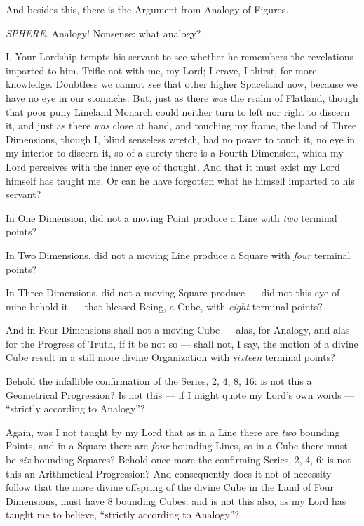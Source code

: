 \documentclass[10pt, kindle, oneside]{kindle}
\begin{document}
And besides this, there is the Argument from Analogy of Figures.

\emph{SPHERE}. Analogy! Nonsense: what analogy?

I. Your Lordship tempts his servant to see whether he remembers the
revelations imparted to him. Trifle not with me, my Lord; I crave, I thirst,
for more knowledge. Doubtless we cannot \emph{see} that other higher Spaceland now,
because we have no eye in our stomachs. But, just as there \emph{was} the realm of
Flatland, though that poor puny Lineland Monarch could neither turn to left
nor right to discern it, and just as there \emph{was} close at hand, and touching my
frame, the land of Three Dimensions, though I, blind senseless wretch, had no
power to touch it, no eye in my interior to discern it, so of a surety there
is a Fourth Dimension, which my Lord perceives with the inner eye of thought.
And that it must exist my Lord himself has taught me. Or can he have forgotten
what he himself imparted to his servant?

In One Dimension, did not a moving Point produce a Line with \emph{two} terminal
points?

In Two Dimensions, did not a moving Line produce a Square with \emph{four} terminal
points?

In Three Dimensions, did not a moving Square produce --- did not this eye of
mine behold it --- that blessed Being, a Cube, with \emph{eight} terminal points?

And in Four Dimensions shall not a moving Cube --- alas, for Analogy, and alas
for the Progress of Truth, if it be not so --- shall not, I say, the motion of a
divine Cube result in a still more divine Organization with \emph{sixteen} terminal
points?

Behold the infallible confirmation of the Series, 2, 4,
8, 16: is not this a Geometrical Progression? Is not this --- if I might quote
my Lord's own words --- ``strictly according to Analogy''?

Again, was I not taught by my Lord that as in a Line there are \emph{two} bounding
Points, and in a Square there are \emph{four} bounding Lines, so in a Cube there must
be \emph{six} bounding Squares? Behold once more the confirming Series, 2, 4, 6: is
not this an Arithmetical Progression? And consequently does it not of
necessity follow that the more divine offspring of the divine Cube in the Land
of Four Dimensions, must have 8 bounding Cubes: and is not this also, as my
Lord has taught me to believe, ``strictly according to Analogy''?
\end{document}
